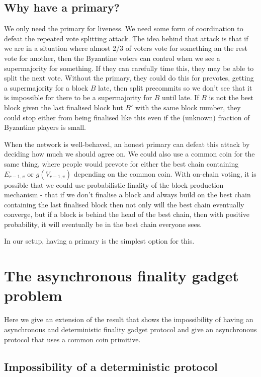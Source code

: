 \documentclass{article}
\begin{document}
\subsection{Why have a primary?}

We only need the primary for liveness. 
We need some form of coordination to defeat the repeated vote splitting attack. The idea behind that attack is that if we are in a situation where almost 2/3 of voters vote for something an the rest vote for another, then the Byzantine voters can control when we see a supermajority for something. If they can carefully time this, they may be able to split the next vote. 
Without the primary, they could do this for prevotes, getting a supermajority for a block $B$ late, then split precommits so we don't see that it is impossible for there to be a supermajority for $B$ until late. 
If $B$ is not the best block given the last finalised block but $B'$  with the same block number, they could stop either from being finalised like this even if the (unknown) fraction of Byzantine players is small.

When the network is well-behaved, an honest primary can defeat this attack by deciding how much we should agree on. We could also use a common coin for the same thing, where people would prevote for either the best chain containing $E_{r-1,v}$ or $g(V_{r-1,v})$ depending on the common coin.
With on-chain voting, it is possible that we could use probabilistic finality of the block production mechanism - that if we don't finalise a block and always build on the best chain containing the last finalised block then not only will the best chain eventually converge, but if a block is behind the head of the best chain, then with positive probability, it will eventually be in the best chain everyone sees.

In our setup, having a primary is the simplest option for this.

\section{The asynchronous finality gadget problem}

Here we give an extension of the \cite{flp} result that shows the impossibility of having an asynchronous and deterministic finality gadget protocol and give an asynchronous protocol that uses a common coin primitive.

\subsection{Impossibility of a deterministic protocol} \label{ssec:impossibility}
\end{document}
